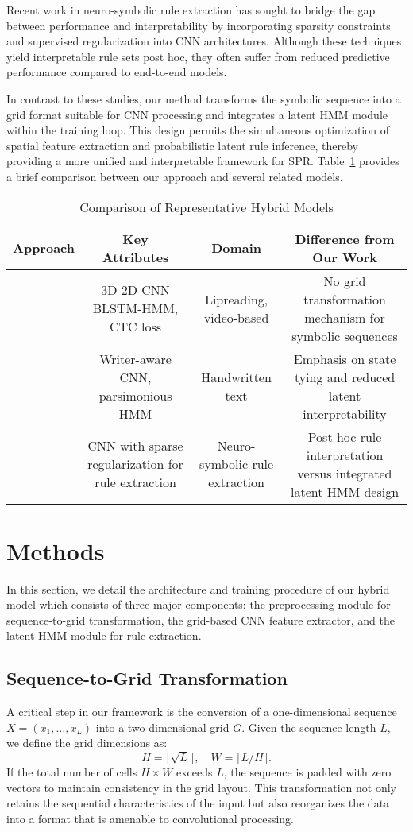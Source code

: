 \documentclass[11pt]{article}
\begin{document}
Recent work in neuro-symbolic rule extraction \cite{arxiv2501.16677v1} has sought to bridge the gap between performance and interpretability by incorporating sparsity constraints and supervised regularization into CNN architectures. Although these techniques yield interpretable rule sets post hoc, they often suffer from reduced predictive performance compared to end-to-end models.

In contrast to these studies, our method transforms the symbolic sequence into a grid format suitable for CNN processing and integrates a latent HMM module within the training loop. This design permits the simultaneous optimization of spatial feature extraction and probabilistic latent rule inference, thereby providing a more unified and interpretable framework for SPR. Table~\ref{tab:related} provides a brief comparison between our approach and several related models.

\begin{table}[h]
\centering
\caption{Comparison of Representative Hybrid Models}
\label{tab:related}
\begin{tabular}{lccc}
\toprule
Approach & Key Attributes & Domain & Difference from Our Work \\
\midrule
\cite{arxiv1906.12170v1} & 3D-2D-CNN BLSTM-HMM, CTC loss & Lipreading, video-based & No grid transformation mechanism for symbolic sequences \\
\cite{arxiv1812.09809v2} & Writer-aware CNN, parsimonious HMM & Handwritten text & Emphasis on state tying and reduced latent interpretability \\
\cite{arxiv2501.16677v1} & CNN with sparse regularization for rule extraction & Neuro-symbolic rule extraction & Post-hoc rule interpretation versus integrated latent HMM design \\
\bottomrule
\end{tabular}
\end{table}

\section{Methods}
In this section, we detail the architecture and training procedure of our hybrid model which consists of three major components: the preprocessing module for sequence-to-grid transformation, the grid-based CNN feature extractor, and the latent HMM module for rule extraction. 

\subsection{Sequence-to-Grid Transformation}
A critical step in our framework is the conversion of a one-dimensional sequence \(X = (x_1, \dots, x_L)\) into a two-dimensional grid \(G\). Given the sequence length \(L\), we define the grid dimensions as:
\[
H = \lfloor \sqrt{L} \rfloor, \quad W = \lceil L/H \rceil.
\]
If the total number of cells \(H \times W\) exceeds \(L\), the sequence is padded with zero vectors to maintain consistency in the grid layout. This transformation not only retains the sequential characteristics of the input but also reorganizes the data into a format that is amenable to convolutional processing.
\end{document}
